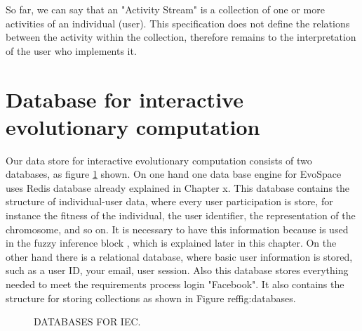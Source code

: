 So far, we can say that an "Activity Stream" is a collection of one or more activities of an individual (user).
This specification does not define the relations between the activity within the collection, therefore remains to the interpretation of the user who implements it.

\section{Database for interactive evolutionary computation}
Our data store for interactive evolutionary computation consists of two databases, as figure \ref{fig:databases} shown. On one hand one  data base  engine for EvoSpace uses Redis database already explained in Chapter x.  This database contains the structure of individual-user data, where every user participation is store, for instance the fitness of the individual, the  user identifier, the representation of the chromosome, and so on. It is necessary to have this information because is used in the fuzzy inference block , which is explained later in this chapter. 
On the other hand there is a relational database, where basic user information is stored, such as a user ID, your email, user session. Also this database  stores everything needed to meet the requirements process login "Facebook". It also contains the structure for storing collections as shown in Figure ref{fig:databases}.

\begin{figure}
\captionsetup{justification=centering,margin=2cm}
\centering
\setlength\fboxsep{0pt}
\setlength\fboxrule{0.7pt}
\caption{DATABASES FOR IEC.}
\label{fig:databases}       
\end{figure}



